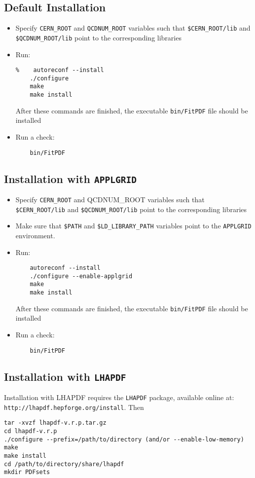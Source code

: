 \documentclass[11pt,a4paper]{article}
\begin{document}
\subsection{Default Installation}
\begin{itemize}
\item
 Specify {\tt CERN\_ROOT} 
     and {\tt QCDNUM\_ROOT} variables such that 
     {\tt \$CERN\_ROOT/lib}  and {\tt \$QCDNUM\_ROOT/lib}
 point to the corresponding libraries
\item Run:
\begin{verbatim}
%    autoreconf --install
    ./configure
    make 
    make install
\end{verbatim}
After these commands are finished, the executable {\tt bin/FitPDF} 
file should be installed
\item  Run a check:
\begin{verbatim}
    bin/FitPDF 
\end{verbatim}
\end{itemize}
\subsection{Installation with {\tt APPLGRID}}
\begin{itemize}
\item
 Specify {\tt CERN\_ROOT} and {QCDNUM\_ROOT} variables such that 
     {\tt \$CERN\_ROOT/lib}  and {\tt \$QCDNUM\_ROOT/lib}
 point to the corresponding libraries
\item Make sure that {\tt \$PATH} and {\tt \$LD\_LIBRARY\_PATH} 
variables point to the {\tt APPLGRID} environment.
\item Run:
\begin{verbatim}
    autoreconf --install
    ./configure --enable-applgrid
    make 
    make install
\end{verbatim}
After these commands are finished, the executable {\tt bin/FitPDF} 
file should be installed
\item  Run a check:
\begin{verbatim}
    bin/FitPDF 
\end{verbatim}
\end{itemize}
\subsection{Installation with {\tt LHAPDF}}\label{sec:install_lhapdf}

Installation with LHAPDF requires the {\tt LHAPDF} package, available online at:\\
{\tt http://lhapdf.hepforge.org/install}.
Then
\begin{verbatim}
tar -xvzf lhapdf-v.r.p.tar.gz
cd lhapdf-v.r.p
./configure --prefix=/path/to/directory (and/or --enable-low-memory)
make
make install
cd /path/to/directory/share/lhapdf
mkdir PDFsets
\end{verbatim}
\end{document}

